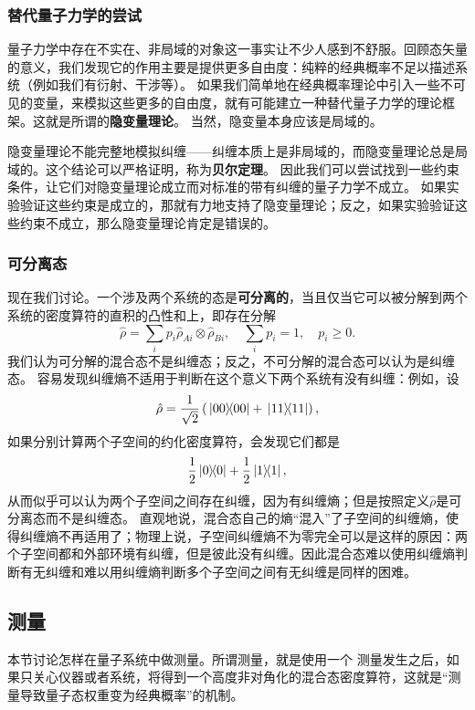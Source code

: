 \documentclass[UTF8, a4paper]{ctexart}
\begin{document}
\subsubsection{替代量子力学的尝试}

量子力学中存在不实在、非局域的对象这一事实让不少人感到不舒服。回顾态矢量的意义，我们发现它的作用主要是提供更多自由度：纯粹的经典概率不足以描述系统（例如我们有衍射、干涉等）。
如果我们简单地在经典概率理论中引入一些不可见的变量，来模拟这些更多的自由度，就有可能建立一种替代量子力学的理论框架。这就是所谓的\textbf{隐变量理论}。
当然，隐变量本身应该是局域的。

隐变量理论不能完整地模拟纠缠——纠缠本质上是非局域的，而隐变量理论总是局域的。这个结论可以严格证明，称为\textbf{贝尔定理}。
因此我们可以尝试找到一些约束条件，让它们对隐变量理论成立而对标准的带有纠缠的量子力学不成立。
如果实验验证这些约束是成立的，那就有力地支持了隐变量理论；反之，如果实验验证这些约束不成立，那么隐变量理论肯定是错误的。

\subsubsection{可分离态}\label{sec:separatable}

现在我们讨论。一个涉及两个系统的态是\textbf{可分离的}，当且仅当它可以被分解到两个系统的密度算符的直积的凸性和上，即存在分解
\begin{equation}
    \hat{\rho} = \sum_i p_i \hat{\rho}_{A i} \otimes \hat{\rho}_{B i}, \quad \sum_i p_i = 1, \quad p_i \geq 0.
\end{equation}
我们认为可分解的混合态不是纠缠态；反之，不可分解的混合态可以认为是纠缠态。
容易发现纠缠熵不适用于判断在这个意义下两个系统有没有纠缠：例如，设
\[
    \hat{\rho} = \frac{1}{\sqrt{2}} \left( \dyad*{00} + \dyad*{11} \right),
\]
如果分别计算两个子空间的约化密度算符，会发现它们都是
\[
    \frac{1}{2} \dyad*{0} + \frac{1}{2} \dyad*{1},
\]
从而似乎可以认为两个子空间之间存在纠缠，因为有纠缠熵；但是按照定义$\hat{\rho}$是可分离态而不是纠缠态。
直观地说，混合态自己的熵“混入”了子空间的纠缠熵，使得纠缠熵不再适用了；物理上说，子空间纠缠熵不为零完全可以是这样的原因：两个子空间都和外部环境有纠缠，但是彼此没有纠缠。因此混合态难以使用纠缠熵判断有无纠缠和难以用纠缠熵判断多个子空间之间有无纠缠是同样的困难。

\subsection{测量}

本节讨论怎样在量子系统中做测量。所谓测量，就是使用一个
测量发生之后，如果只关心仪器或者系统，将得到一个高度非对角化的混合态密度算符，这就是“测量导致量子态权重变为经典概率”的机制。
\end{document}
